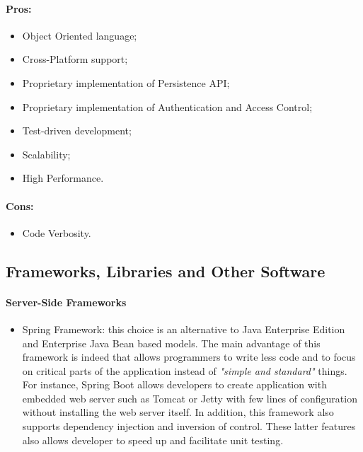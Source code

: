 \documentclass[a4paper]{article}
\begin{document}
\paragraph{Pros:}

\begin{itemize}
    \item Object Oriented language;
    \item Cross-Platform support;
    \item Proprietary implementation of Persistence API;
    \item Proprietary implementation of Authentication and Access Control;
    \item Test-driven development;
    \item Scalability;
    \item High Performance.
\end{itemize}

\paragraph{Cons:}
\begin{itemize}
    \item Code Verbosity.
\end{itemize}

\subsection{Frameworks, Libraries and Other Software}

\paragraph{Server-Side Frameworks}
\begin{itemize}
    \item Spring Framework: this choice is an alternative to Java Enterprise Edition and Enterprise Java Bean based models. The main advantage of this framework is indeed that allows programmers to write less code and to focus on critical parts of the application instead of \textit{"simple and standard"} things. For instance, Spring Boot allows developers to create application with embedded web server such as Tomcat or Jetty with few lines of configuration without installing the web server itself. In addition, this framework also supports dependency injection and inversion of control. These latter features also allows developer to speed up and facilitate unit testing.
\end{itemize}
\end{document}
